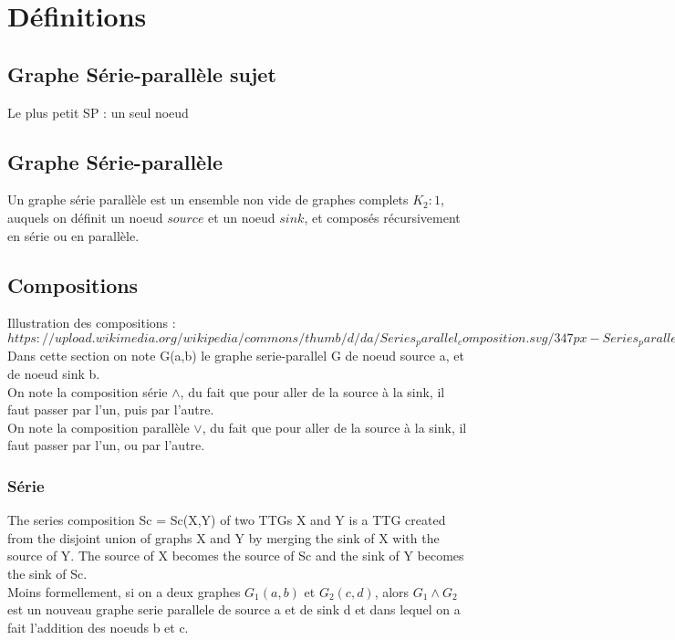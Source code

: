 \documentclass[11pt]{report}
\begin{document}
\section{Définitions}
\subsection{Graphe Série-parallèle sujet}
Le plus petit SP : un seul noeud

\subsection{Graphe Série-parallèle}
Un graphe série parallèle est un ensemble non vide de graphes complets $K_2:1$, auquels on définit un noeud $source$ et un noeud $sink$, et composés récursivement en série ou en parallèle.
\subsection{Compositions}
Illustration des compositions : \\
$https://upload.wikimedia.org/wikipedia/commons/thumb/d/da/Series_parallel_composition.svg/347px-Series_parallel_composition.svg.png$\\
Dans cette section on note G(a,b) le graphe serie-parallel G de noeud source a, et de noeud sink b.\\
On note la composition série $\wedge$, du fait que pour aller de la source à la sink, il faut passer par l'un, puis par l'autre.\\
On note la composition parallèle $\vee$, du fait que pour aller de la source à la sink, il faut passer par l'un, ou par l'autre.
\subsubsection{Série}
The series composition Sc = Sc(X,Y) of two TTGs X and Y is a TTG created from the disjoint union of graphs X and Y by merging the sink of X with the source of Y. The source of X becomes the source of Sc and the sink of Y becomes the sink of Sc.\\
Moins formellement, si on a deux graphes $G_1(a,b)$ et $G_2(c,d)$, alors $G_1 \wedge G_2$ est un nouveau graphe serie parallele de source a et de sink d et dans lequel on a fait l'addition des noeuds b et c.\\
\end{document}
